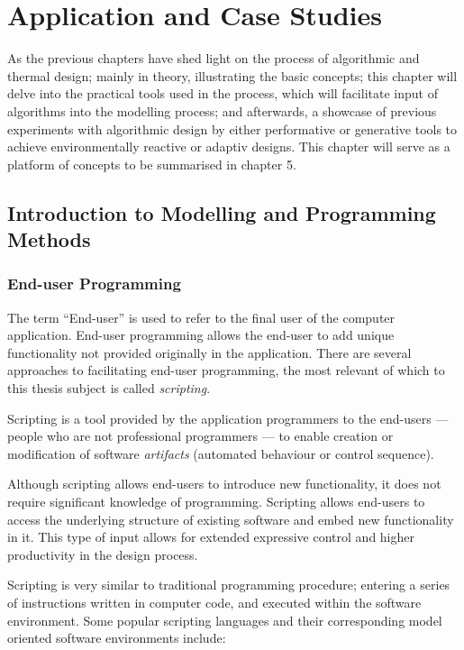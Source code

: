 \chapter{Application and Case Studies}

As the previous chapters have shed light on the process of algorithmic and thermal design; mainly in theory, illustrating the basic concepts; this chapter will delve into the practical tools used in the process, which will facilitate input of algorithms into the modelling process; and afterwards, a showcase of previous experiments with algorithmic design by either performative or generative tools to achieve environmentally reactive or adaptiv designs. This chapter will serve as a platform of concepts to be summarised in chapter 5.

\section{Introduction to Modelling and Programming Methods}

\subsection{End-user Programming}
\label{sec:EndUserProgramming}

The term ``End-user'' is used to refer to the final user of the computer application. End-user programming  allows the end-user to add unique functionality not provided originally in the application. There are several approaches to facilitating end-user programming, the most relevant of which to this thesis subject is called \emph{scripting}.

Scripting is a tool provided by the application programmers to the end-users --- people who are not professional programmers --- to enable creation or modification of software \emph{artifacts} (automated behaviour or control sequence).

Although scripting allows end-users to introduce new functionality, it does not require significant knowledge of programming. Scripting allows end-users to access the underlying structure of existing software and embed new functionality in it. This type of input allows for extended expressive control and higher productivity in the design process. \cite{kashyap01}

Scripting is very similar to traditional programming procedure; entering a series of instructions written in computer code, and executed within the software environment. Some popular scripting languages and their corresponding model oriented software environments include: 

